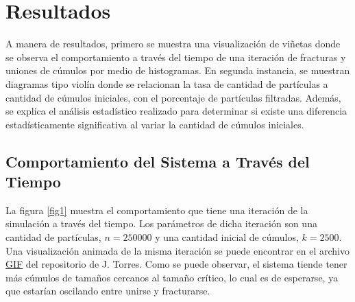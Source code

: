 \documentclass{article}
\begin{document}
\section{Resultados}\label{res}

A manera de resultados, primero se muestra una visualizaci\'on de vi\~netas donde se observa el comportamiento a trav\'es del tiempo de una iteraci\'on de fracturas y uniones de c\'umulos por medio de histogramas. En segunda instancia, se muestran diagramas tipo viol\'in donde se relacionan la tasa de cantidad de part\'iculas a cantidad de c\'umulos iniciales, con el porcentaje de part\'iculas filtradas. Adem\'as, se explica el an\'alisis estad\'istico realizado para determinar si existe una diferencia estad\'isticamente significativa al variar la cantidad de c\'umulos iniciales.

\subsection{Comportamiento del Sistema a Trav\'es del Tiempo}

La figura \ref{fig1} muestra el comportamiento que tiene una iteraci\'on de la simulaci\'on a trav\'es del tiempo. Los par\'ametros de dicha iteraci\'on son una cantidad de part\'iculas, $n=250000$ y una cantidad inicial de c\'umulos, $k=2500$. Una visualizaci\'on animada de la misma iteraci\'on se puede encontrar en el archivo \href{https://github.com/FeroxDeitas/Simulacion-Nano/blob/main/Tareas/P8/urnas.gif}{GIF} del repositorio de J. Torres. Como se puede observar, el sistema tiende tener m\'as c\'umulos de tama\~nos cercanos al tama\~no cr\'itico, lo cual es de esperarse, ya que estar\'ian oscilando entre unirse y fracturarse.
\end{document}
